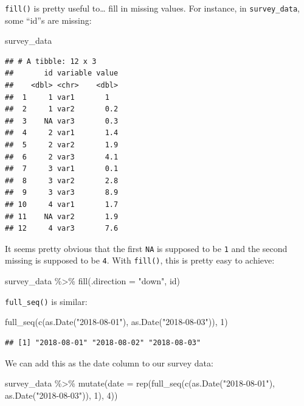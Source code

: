 \documentclass[
]{article}
\newenvironment{Shaded}{\begin{snugshade}}{\end{snugshade}}
\newcommand{\AttributeTok}[1]{\textcolor[rgb]{0.77,0.63,0.00}{#1}}
\newcommand{\DecValTok}[1]{\textcolor[rgb]{0.00,0.00,0.81}{#1}}
\newcommand{\FunctionTok}[1]{\textcolor[rgb]{0.00,0.00,0.00}{#1}}
\newcommand{\NormalTok}[1]{#1}
\newcommand{\SpecialCharTok}[1]{\textcolor[rgb]{0.00,0.00,0.00}{#1}}
\newcommand{\StringTok}[1]{\textcolor[rgb]{0.31,0.60,0.02}{#1}}
\begin{document}
\texttt{fill()} is pretty useful to\ldots{} fill in missing values. For instance, in \texttt{survey\_data}, some ``id''s
are missing:

\begin{Shaded}
\begin{Highlighting}[]
\NormalTok{survey\_data}
\end{Highlighting}
\end{Shaded}

\begin{verbatim}
## # A tibble: 12 x 3
##       id variable value
##    <dbl> <chr>    <dbl>
##  1     1 var1       1  
##  2     1 var2       0.2
##  3    NA var3       0.3
##  4     2 var1       1.4
##  5     2 var2       1.9
##  6     2 var3       4.1
##  7     3 var1       0.1
##  8     3 var2       2.8
##  9     3 var3       8.9
## 10     4 var1       1.7
## 11    NA var2       1.9
## 12     4 var3       7.6
\end{verbatim}

It seems pretty obvious that the first \texttt{NA} is supposed to be \texttt{1} and the second missing is supposed
to be \texttt{4}. With \texttt{fill()}, this is pretty easy to achieve:

\begin{Shaded}
\begin{Highlighting}[]
\NormalTok{survey\_data }\SpecialCharTok{\%\textgreater{}\%}
    \FunctionTok{fill}\NormalTok{(}\AttributeTok{.direction =} \StringTok{"down"}\NormalTok{, id)}
\end{Highlighting}
\end{Shaded}

\texttt{full\_seq()} is similar:

\begin{Shaded}
\begin{Highlighting}[]
\FunctionTok{full\_seq}\NormalTok{(}\FunctionTok{c}\NormalTok{(}\FunctionTok{as.Date}\NormalTok{(}\StringTok{"2018{-}08{-}01"}\NormalTok{), }\FunctionTok{as.Date}\NormalTok{(}\StringTok{"2018{-}08{-}03"}\NormalTok{)), }\DecValTok{1}\NormalTok{)}
\end{Highlighting}
\end{Shaded}

\begin{verbatim}
## [1] "2018-08-01" "2018-08-02" "2018-08-03"
\end{verbatim}

We can add this as the date column to our survey data:

\begin{Shaded}
\begin{Highlighting}[]
\NormalTok{survey\_data }\SpecialCharTok{\%\textgreater{}\%}
    \FunctionTok{mutate}\NormalTok{(}\AttributeTok{date =} \FunctionTok{rep}\NormalTok{(}\FunctionTok{full\_seq}\NormalTok{(}\FunctionTok{c}\NormalTok{(}\FunctionTok{as.Date}\NormalTok{(}\StringTok{"2018{-}08{-}01"}\NormalTok{), }\FunctionTok{as.Date}\NormalTok{(}\StringTok{"2018{-}08{-}03"}\NormalTok{)), }\DecValTok{1}\NormalTok{), }\DecValTok{4}\NormalTok{))}
\end{Highlighting}
\end{Shaded}
\end{document}
